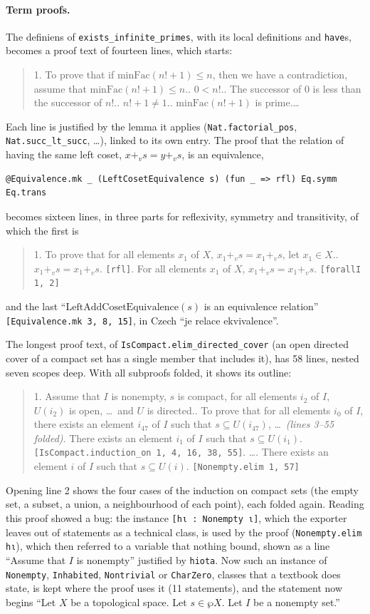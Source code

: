 \documentclass{easychair}
\newcommand{\ttt}[1]{\texttt{#1}}
\newcommand{\reading}[1]{\begin{quote}\small #1\end{quote}}
\begin{document}
\paragraph{Term proofs.} The definiens of \ttt{exists\_infinite\_primes}, with its local
definitions and \ttt{have}s, becomes a proof text of fourteen lines, which starts:
\reading{1. To prove that if $\mathrm{minFac}(n! + 1) \leq n$, then we have a contradiction,
assume that $\mathrm{minFac}(n! + 1) \leq n$.\quad 2. $0 < n!$.\quad 3. The successor of
$0$ is less than the successor of $n!$.\quad 4. $n! + 1 \neq 1$.\quad 5.
$\mathrm{minFac}(n! + 1)$ is prime.\quad \ldots}
\noindent Each line is justified by the lemma it applies (\ttt{Nat.factorial\_pos},
\ttt{Nat.succ\_lt\_succ}, \ldots), linked to its own entry. The proof that the relation of
having the same left coset, $x +_v s = y +_v s$, is an equivalence,
\begin{lstlisting}
@Equivalence.mk _ (LeftCosetEquivalence s) (fun _ => rfl) Eq.symm Eq.trans
\end{lstlisting}
becomes sixteen lines, in three parts for reflexivity, symmetry and transitivity, of which the
first is
\reading{1. To prove that for all elements $x_1$ of $X$, $x_1 +_v s = x_1 +_v s$, let
$x_1 \in X$.\quad 2. $x_1 +_v s = x_1 +_v s$. \ttt{[rfl]}\quad 3. For all elements $x_1$ of $X$,
$x_1 +_v s = x_1 +_v s$. \ttt{[forallI 1, 2]}}
\noindent and the last ``$\mathrm{LeftAddCosetEquivalence}(s)$ is an equivalence relation''
\ttt{[Equivalence.mk 3, 8, 15]}, in Czech ``je relace ekvivalence''.

The longest proof text, of \ttt{IsCompact.elim\_directed\_cover} (an open directed cover of a
compact set has a single member that includes it), has 58 lines, nested seven scopes deep.
With all subproofs folded, it shows its outline:
\reading{1. Assume that $I$ is nonempty, $s$ is compact, for all elements $i_2$ of $I$, $U(i_2)$ is open, \ldots\
and $U$ is directed.\quad 2. To prove that for all elements $i_0$ of $I$, there exists an
element $i_{47}$ of $I$ such that $s \subseteq U(i_{47})$, \ldots\ \emph{(lines 3--55
folded)}\quad 56. There exists an element $i_1$ of $I$ such that $s \subseteq U(i_1)$.
\ttt{[IsCompact.induction\_on 1, 4, 16, 38, 55]}\quad 57. \ldots\quad 58. There exists an
element $i$ of $I$ such that $s \subseteq U(i)$. \ttt{[Nonempty.elim 1, 57]}}
\noindent Opening line 2 shows the four cases of the induction on compact sets (the empty set, a
subset, a union, a neighbourhood of each point), each folded again. Reading this proof showed a
bug: the instance \ttt{[hι : Nonempty ι]}, which the exporter leaves out of statements as a
technical class, is used by the proof (\ttt{Nonempty.elim hι}), which then referred to a
variable that nothing bound, shown as a line ``Assume that $I$ is nonempty'' justified by
\ttt{hiota}. Now such an instance of \ttt{Nonempty}, \ttt{Inhabited}, \ttt{Nontrivial} or
\ttt{CharZero}, classes that a textbook does state, is kept where the proof uses it (11
statements), and the statement now begins ``Let $X$ be a topological space. Let $s \in \wp X$. Let
$I$ be a nonempty set.''
\end{document}
